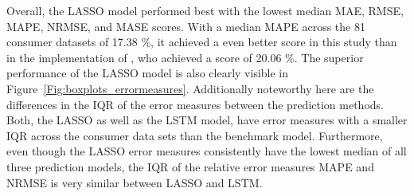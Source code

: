 Overall, the LASSO model performed best with the lowest median MAE, RMSE, MAPE, NRMSE, and MASE scores. With a median MAPE across the 81 consumer datasets of 17.38 \%, it achieved a even better score in this study than in the implementation of \citet{Li:2017}, who achieved a score of 20.06 \%. The superior performance of the LASSO model is also clearly visible in Figure~\ref{Fig:boxplots_errormeasures}. Additionally noteworthy here are the differences in the IQR of the error measures between the prediction methods. Both, the LASSO as well as the LSTM model, have error measures with a smaller IQR across the consumer data sets than the benchmark model. Furthermore, even though the LASSO error measures consistently have the lowest median of all three prediction models, the IQR of the relative error measures MAPE and NRMSE is very similar between LASSO and LSTM.
%
